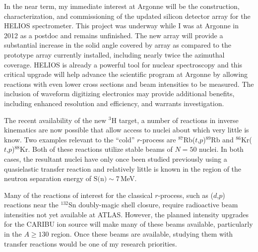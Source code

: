 {In the near term, my immediate interest at Argonne will be the construction, characterization, and commissioning of the updated silicon detector array for the HELIOS spectrometer.
This project was underway while I was at Argonne in 2012 as a postdoc and remains unfinished. 
The new array will provide a substantial increase in the solid angle covered by array as compared to the prototype array currently installed, including nearly twice the azimuthal coverage. %
HELIOS is already a powerful tool for nuclear spectroscopy and this critical upgrade will help 
advance the scientific program at Argonne by allowing reactions with even lower cross sections and beam intensities to be measured. The inclusion of waveform digitizing electronics may provide additional benefits, including enhanced resolution and efficiency, and warrants investigation.

The recent availability of the new $^3$H target, a number of reactions in inverse kinematics are now possible that %
allow access to nuclei about which very little is know. Two examples relevant to the ``cold'' $r$-process are $^{87}$Rb($t$,$p$)$^{89}$Rb and $^{86}$Kr($t$,$p$)$^{88}$Kr. Both of these reactions utilize stable beams of $N=50$ nuclei. In both cases, the resultant nuclei have 
only once been studied previously using a quasielastic transfer reaction and relatively little is known in the region of the neutron separation energy of $\textrm{S(n)}\sim 7$\,MeV.

Many of the reactions of interest for the classical $r$-process, such as ($d$,$p$) reactions near the $^{132}$Sn doubly-magic shell closure, require radioactive beam intensities not yet available at ATLAS. However, the planned intensity upgrades for the CARIBU ion source will make many of these %
 beams available, particularly in the $A \geq 130$ region. Once these beams are available, studying them with transfer reactions would be one of my research priorities. 



%

}
